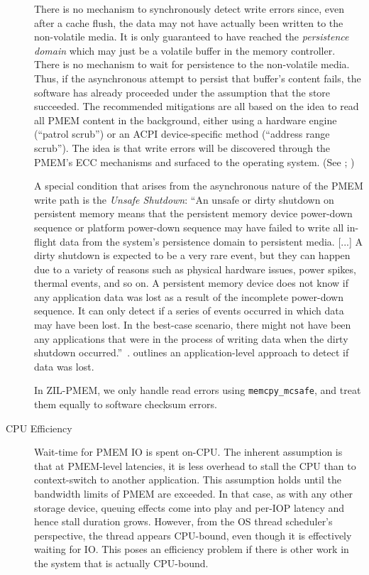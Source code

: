 \documentclass[12pt,a4paper,twoside]{book}
\begin{document}
\begin{description}
        There is no mechanism to synchronously detect write errors since, even after a cache flush, the data may not have actually been written to the non-volatile media.
        It is only guaranteed to have reached the \textit{persistence domain} which may just be a volatile buffer in the memory controller.
        There is no mechanism to wait for persistence to the non-volatile media.
        Thus, if the asynchronous attempt to persist that buffer's content fails, the software has already proceeded under the assumption that the store succeeded.
        The recommended mitigations are all based on the idea to read all PMEM content in the background, either using a hardware engine (``patrol scrub'') or an ACPI device-specific method (``address range scrub'').
        The idea is that write errors will be discovered through the PMEM's ECC mechanisms and surfaced to the operating system.
        (See \cite{ReliabilityAvailabilityServiceability}; \cite[Chapter 17]{Scargall2020})

        A special condition that arises from the asynchronous nature of the PMEM write path is the \textit{Unsafe Shutdown}:
        ``An unsafe or dirty shutdown on persistent memory means that the persistent memory
        device power-down sequence or platform power-down sequence may have failed
        to write all in-flight data from the system’s persistence domain to persistent media.
        [...] A dirty shutdown is expected to be a very
        rare event, but they can happen due to a variety of reasons such as physical hardware
        issues, power spikes, thermal events, and so on.
        A persistent memory device does not know if any application data was lost as a result
        of the incomplete power-down sequence. It can only detect if a series of events occurred
        in which data may have been lost. In the best-case scenario, there might not have been
        any applications that were in the process of writing data when the dirty shutdown
        occurred.''~\cite[Chapter 17]{Scargall2020}.
        \citeauthor{Scargall2020}\cite{Scargall2020} outlines an application-level approach to detect if data was lost.

        In ZIL-PMEM, we only handle read errors using \lstinline{memcpy_mcsafe}, and treat them equally to software checksum errors.

    \item[CPU Efficiency] Wait-time for PMEM IO is spent on-CPU.
        The inherent assumption is that at PMEM-level latencies, it is less overhead to stall the CPU than to context-switch to another application.
        This assumption holds until the bandwidth limits of PMEM are exceeded.
        In that case, as with any other storage device, queuing effects come into play and per-IOP latency and hence stall duration grows.
        However, from the OS thread scheduler's perspective, the thread appears CPU-bound, even though it is effectively waiting for IO.
        This poses an efficiency problem if there is other work in the system that is actually CPU-bound.


\end{description}
\end{document}
